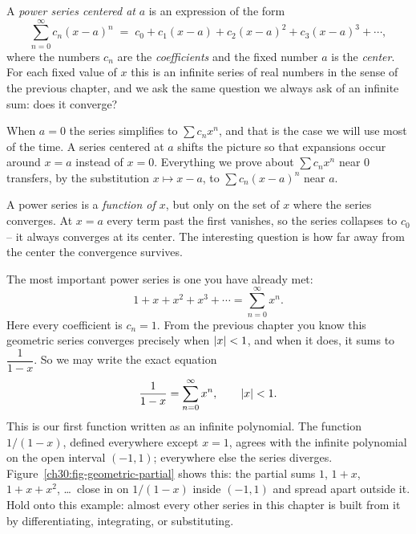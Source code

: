 \begin{definition}
\label{ch30:def-power-series}
A \emph{power series centered at} $a$ is an expression of the form
\[
  \sum_{n=0}^{\infty} c_n (x-a)^n
  \;=\; c_0 + c_1(x-a) + c_2(x-a)^2 + c_3(x-a)^3 + \cdots,
\]
where the numbers $c_n$ are the \emph{coefficients} and the fixed number $a$ is the \emph{center}. For each fixed value of $x$ this is an infinite series of real numbers in the sense of the previous chapter, and we ask the same question we always ask of an infinite sum: does it converge?
\end{definition}

When $a=0$ the series simplifies to $\sum c_n x^n$, and that is the case we will use most of the time. A series centered at $a$ shifts the picture so that expansions occur around $x=a$ instead of $x=0$. Everything we prove about $\sum c_n x^n$ near $0$ transfers, by the substitution $x \mapsto x-a$, to $\sum c_n (x-a)^n$ near $a$.

A power series is a \emph{function of $x$}, but only on the set of $x$ where the series converges. At $x=a$ every term past the first vanishes, so the series collapses to $c_0$ -- it always converges at its center. The interesting question is how far away from the center the convergence survives.

\begin{example}
\label{ch30:ex-geometric}
The most important power series is one you have already met:
\[
  1 + x + x^2 + x^3 + \cdots = \sum_{n=0}^{\infty} x^n.
\]
Here every coefficient is $c_n = 1$. From the previous chapter you know this geometric series converges precisely when $\lvert x\rvert < 1$, and when it does, it sums to $\dfrac{1}{1-x}$. So we may write the exact equation
\[
  \frac{1}{1-x} = \sum_{n=0}^{\infty} x^n, \qquad \lvert x\rvert < 1.
\]
This is our first function written as an infinite polynomial. The function $1/(1-x)$, defined everywhere except $x=1$, agrees with the infinite polynomial on the open interval $(-1,1)$; everywhere else the series diverges. Figure~\ref{ch30:fig-geometric-partial} shows this: the partial sums $1$, $1+x$, $1+x+x^2$, \dots\ close in on $1/(1-x)$ inside $(-1,1)$ and spread apart outside it. Hold onto this example: almost every other series in this chapter is built from it by differentiating, integrating, or substituting.
\end{example}


